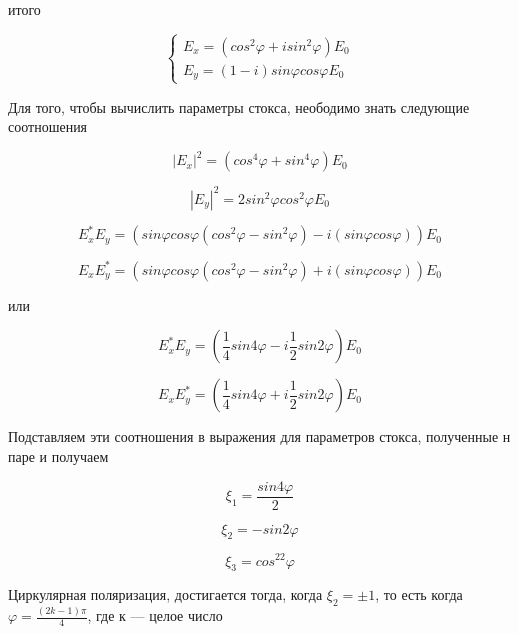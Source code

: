 \documentclass[12pt,a4paper]{article}
\begin{document}
итого

\begin{equation}
\begin{cases}
E_{x} = (cos^2\varphi + i sin^2 \varphi)E_{0} \\
E_{y} =  (1 -i) sin\varphi cos\varphi E_{0} 
\end{cases}
\end{equation}

Для того, чтобы вычислить параметры стокса, неободимо знать следующие соотношения 

\begin{equation}
|E_{x}|^2 = (cos^4\varphi + sin^4 \varphi)E_{0}
\end{equation}

\begin{equation}
|E_{y}|^2 = 2 sin^2\varphi cos^2\varphi E_{0} 
\end{equation}

\begin{equation}
E_{x}^*E_{y} = (sin\varphi cos\varphi(cos^2\varphi - sin^2 \varphi) - i(sin\varphi cos\varphi)) E_{0} 
\end{equation}

\begin{equation}
E_{x}E_{y}^* = (sin\varphi cos\varphi(cos^2\varphi - sin^2 \varphi) + i(sin\varphi cos\varphi)) E_{0}
\end{equation}

или

\begin{equation}
E_{x}^*E_{y} = (\frac{1}4 sin4\varphi- i\frac{1}2sin2\varphi) E_{0} 
\end{equation}

\begin{equation}
E_{x}E_{y}^* = (\frac{1}4 sin4\varphi + i\frac{1}2sin2\varphi) E_{0}
\end{equation}

Подставляем эти соотношения в выражения для параметров стокса, полученные н паре и получаем

\begin{equation}
\xi_1 = \frac{sin4\varphi}{2}
\end{equation}

\begin{equation}
\xi_2 = -sin2\varphi
\end{equation}

\begin{equation}
\xi_3 = cos^22\varphi
\end{equation}

Циркулярная поляризация, достигается тогда, когда $\xi_2 = \pm 1$, то есть когда $\varphi = \frac{(2k-1)\pi}4$, где к --- целое число 
\end{document}

